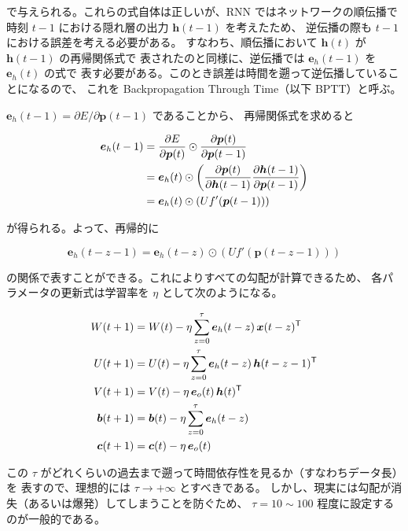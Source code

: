 \documentclass[a4paper,11pt,openany]{ltjsreport}
\begin{document}
で与えられる。これらの式自体は正しいが、RNN ではネットワークの順伝播で
時刻 $t-1$ における隠れ層の出力 $\bm{h}(t-1)$ を考えたため、
逆伝播の際も $t-1$ における誤差を考える必要がある。
すなわち、順伝播において $\bm{h}(t)$ が $\bm{h}(t-1)$ の再帰関係式で
表されたのと同様に、逆伝播では $\bm{e}_h(t-1)$ を $\bm{e}_h(t)$ の式で
表す必要がある。このとき誤差は時間を遡って逆伝播していることになるので、
これを Backpropagation Through Time（以下 BPTT）と呼ぶ\cite{werbos1990}。

$\bm{e}_h(t-1) = \partial E / \partial \bm{p}(t-1)$ であることから、
再帰関係式を求めると

\begin{align}
  \bm{e}_h(t-1)
   &= \frac{\partial E}{\partial \bm{p}(t)} \odot \frac{\partial \bm{p}(t)}{\partial \bm{p}(t-1)} \notag\\
   &= \bm{e}_h(t) \odot \left(
        \frac{\partial \bm{p}(t)}{\partial \bm{h}(t-1)}
        \frac{\partial \bm{h}(t-1)}{\partial \bm{p}(t-1)} \right) \label{eq:bptt}\\
   &= \bm{e}_h(t) \odot \left( U f'(\bm{p}(t-1)) \right) \notag
\end{align}

が得られる。よって、再帰的に

\begin{equation}
  \bm{e}_h(t-z-1) = \bm{e}_h(t-z) \odot \left( U f'(\bm{p}(t-z-1)) \right)
  \label{eq:bptt_z}
\end{equation}

の関係で表すことができる。これによりすべての勾配が計算できるため、
各パラメータの更新式は学習率を $\eta$ として次のようになる。

\begin{align}
  W(t+1) &= W(t) - \eta \sum_{z=0}^{\tau} \bm{e}_h(t-z)\,\bm{x}(t-z)^{\mathsf{T}} \notag\\
  U(t+1) &= U(t) - \eta \sum_{z=0}^{\tau} \bm{e}_h(t-z)\,\bm{h}(t-z-1)^{\mathsf{T}} \notag\\
  V(t+1) &= V(t) - \eta\, \bm{e}_o(t)\,\bm{h}(t)^{\mathsf{T}} \label{eq:update}\\
  \bm{b}(t+1) &= \bm{b}(t) - \eta \sum_{z=0}^{\tau} \bm{e}_h(t-z) \notag\\
  \bm{c}(t+1) &= \bm{c}(t) - \eta\, \bm{e}_o(t) \notag
\end{align}

この $\tau$ がどれくらいの過去まで遡って時間依存性を見るか（すなわちデータ長）を
表すので、理想的には $\tau \to +\infty$ とすべきである。
しかし、現実には勾配が消失（あるいは爆発）してしまうことを防ぐため、
$\tau = 10 \sim 100$ 程度に設定するのが一般的である\cite{sugomori2019}。
\end{document}
